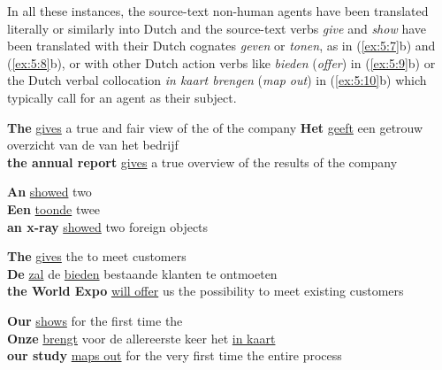 \documentclass[output=paper]{LSP/langsci}
\begin{document}
In all these instances, the source-text non-human agents have been translated literally or similarly into Dutch and the source-text verbs \textit{give} and \textit{show} have been translated with their Dutch cognates \textit{geven} or \textit{tonen}, as in (\ref{ex:5:7}b) and (\ref{ex:5:8}b), or with other Dutch action verbs like \textit{bieden} (\textit{offer}) in (\ref{ex:5:9}b) or the Dutch verbal collocation \textit{in kaart brengen} (\textit{map out}) in (\ref{ex:5:10}b) which typically call for an agent as their subject.      

\ea \label{ex:5:7}
\ea
\textbf{The}  \ul{gives} a true and fair view of the  of the company
\ex
\textbf{Het}  \ul{geeft} een getrouw overzicht van de  van het bedrijf\\
\textbf{the annual report} \ul{gives} a true overview of the results of the company
\z
\z



\ea \label{ex:5:8}
\ea
\textbf{An}  \ul{showed} two \\[1em]
\ex \textbf{Een}  \ul{toonde} twee \\
\textbf{an x-ray} \ul{showed} two foreign objects
\z
\z


\newpage


\ea \label{ex:5:9} 
\ea
\textbf{The}  \ul{gives}  the  to meet customers\\[1em]
\ex
\textbf{De}  \ul{zal}  de  \ul{bieden} bestaande klanten te ontmoeten\\
\textbf{the World Expo} \ul{will offer} us the possibility to meet existing customers
\z
\z


\ea \label{ex:5:10}
\ea
\textbf{Our}  \ul{shows} for the first time the \\[1em]
\ex
\textbf{Onze}  \ul{brengt} voor de allereerste keer het  \ul{in kaart}\\
\textbf{our study} \ul{maps out} for the very first time the entire process
\z
\z
\end{document}
